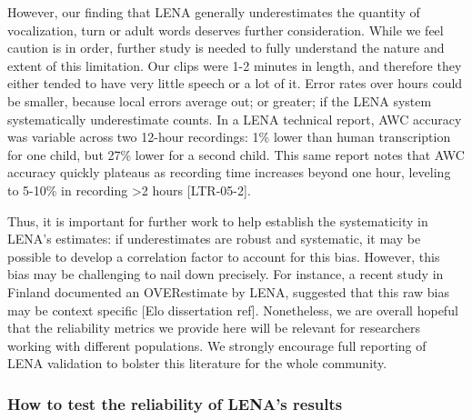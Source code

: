 \documentclass[english,floatsintext,man]{apa6}
\begin{document}
However, our finding that LENA generally underestimates the quantity of
vocalization, turn or adult words deserves further consideration. While
we feel caution is in order, further study is needed to fully understand
the nature and extent of this limitation. Our clips were 1-2 minutes in
length, and therefore they either tended to have very little speech or a
lot of it. Error rates over hours could be smaller, because local errors
average out; or greater; if the LENA system systematically underestimate
counts. In a LENA technical report, AWC accuracy was variable across two
12-hour recordings: 1\% lower than human transcription for one child,
but 27\% lower for a second child. This same report notes that AWC
accuracy quickly plateaus as recording time increases beyond one hour,
leveling to 5-10\% in recording \textgreater{}2 hours {[}LTR-05-2{]}.

Thus, it is important for further work to help establish the
systematicity in LENA's estimates: if underestimates are robust and
systematic, it may be possible to develop a correlation factor to
account for this bias. However, this bias may be challenging to nail
down precisely. For instance, a recent study in Finland documented an
OVERestimate by LENA, suggested that this raw bias may be context
specific {[}Elo dissertation ref{]}. Nonetheless, we are overall hopeful
that the reliability metrics we provide here will be relevant for
researchers working with different populations. We strongly encourage
full reporting of LENA validation to bolster this literature for the
whole community.

\subsubsection{How to test the reliability of LENA's
results}\label{how-to-test-the-reliability-of-lenas-results}
\end{document}
